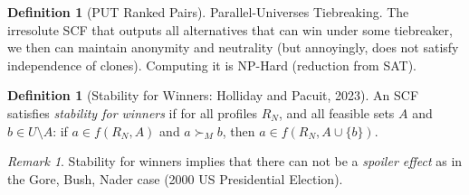 \documentclass{book}
\theoremstyle{plain}
\theoremstyle{definition}
\newtheorem{definition}[theorem]{Definition}
\theoremstyle{remark}
\newtheorem{remark}[theorem]{Remark}
\begin{document}
\begin{definition}[PUT Ranked Pairs]
    Parallel-Universes Tiebreaking.
    The irresolute SCF that outputs all alternatives that 
    can win under some tiebreaker, 
    we then can maintain anonymity and neutrality 
    (but annoyingly, does not satisfy independence of clones).
    Computing it is NP-Hard (reduction from SAT).
\end{definition}

\begin{definition}[Stability for Winners: Holliday and Pacuit, 2023]
    An SCF satisfies
    \emph{stability for winners} if for all profiles $R_N$,
    and all feasible sets $A$ and $b \in U \setminus A$:
    if $a \in f(R_N, A)$ and $a \succ_M b$, then $a \in f(R_N, A \cup \{b\})$.
\end{definition}

\begin{remark}
    Stability for winners implies that there can not be 
    a \emph{spoiler effect} as in 
    the Gore, Bush, Nader case (2000 US Presidential Election).
\end{remark}
\end{document}
